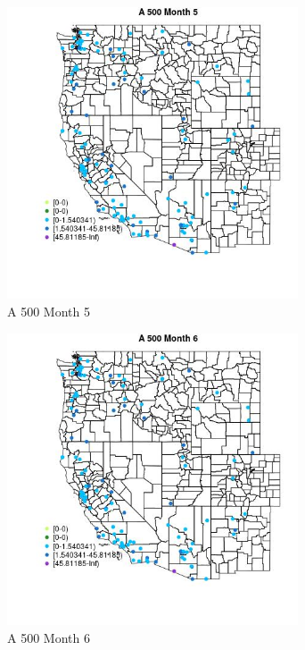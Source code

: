 \begin{figure} 
\centering  
\includegraphics[width=0.77\textwidth]{Code_Outputs/Report_ML_input_PM25_Step4_part_e_de_duplicated_aves_MapObsMo5A_500.jpg} 
\caption{\label{fig:Report_ML_input_PM25_Step4_part_e_de_duplicated_avesMapObsMo5A_500}A 500 Month 5} 
\end{figure} 
 

\clearpage 

\begin{figure} 
\centering  
\includegraphics[width=0.77\textwidth]{Code_Outputs/Report_ML_input_PM25_Step4_part_e_de_duplicated_aves_MapObsMo6A_500.jpg} 
\caption{\label{fig:Report_ML_input_PM25_Step4_part_e_de_duplicated_avesMapObsMo6A_500}A 500 Month 6} 
\end{figure} 
 

